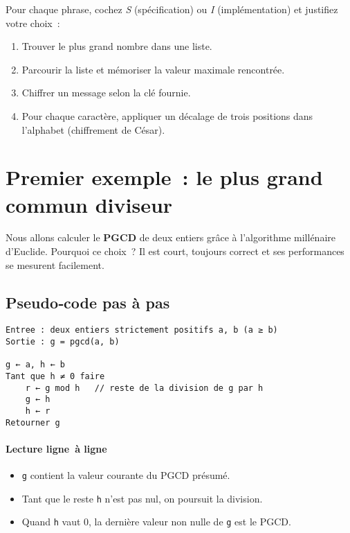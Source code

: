 \begin{exercice}
Pour chaque phrase, cochez \emph{S} (spécification) ou \emph{I} (implémentation)
et justifiez votre choix :
\begin{enumerate}[label=\alph*)]
  \item \og Trouver le plus grand nombre dans une liste. \fg{}
  \item \og Parcourir la liste et mémoriser la valeur maximale rencontrée. \fg{}
  \item \og Chiffrer un message selon la clé fournie. \fg{}
  \item \og Pour chaque caractère, appliquer un décalage de trois positions dans
        l’alphabet (chiffrement de César). \fg{}
\end{enumerate}
\end{exercice}

\section{Premier exemple : le plus grand commun diviseur}

Nous allons calculer le \textbf{PGCD} de deux entiers grâce à l’algorithme
millénaire d’Euclide. Pourquoi ce choix ? Il est court, toujours correct et ses
performances se mesurent facilement.

\subsection{Pseudo‑code pas à pas}
\begin{lstlisting}[caption={Algorithme d'Euclide (version itérative)}]
Entree : deux entiers strictement positifs a, b (a ≥ b)
Sortie : g = pgcd(a, b)

g ← a, h ← b
Tant que h ≠ 0 faire
    r ← g mod h   // reste de la division de g par h
    g ← h
    h ← r
Retourner g
\end{lstlisting}

\paragraph{Lecture ligne à ligne}
\begin{itemize}
  \item \texttt{g} contient la valeur courante du PGCD présumé.
  \item Tant que le reste \texttt{h} n’est pas nul, on poursuit la division.
  \item Quand \texttt{h} vaut 0, la dernière valeur non nulle de \texttt{g} est
        le PGCD.
\end{itemize}

